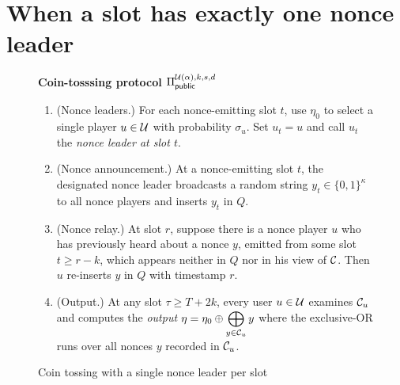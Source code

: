 \section{When a slot has exactly one nonce leader}\label{sec:coin-tossing-single-leader}
\newcommand{\CoinTossingPublic}{\Pi_\mathsf{public}^{\Players(\alpha),k,s,d}}

\begin{figure}
  \begin{framed}    
    \begin{center}
        \textbf{Coin-tosssing protocol $\CoinTossingPublic$}
    \end{center}
    \begin{enumerate}
      \item 
      (Nonce leaders.) 
      For each nonce-emitting slot $t$, use $\eta_0$ to 
      select a single player $u \in \mathcal{U}$ 
      with probability $\sigma_{u}$. 
      Set $u_t = u$ and call $u_t$ the \emph{nonce leader at slot $t$}.
      
      \item 
      (Nonce announcement.)
      At a nonce-emitting slot $t$, the designated nonce leader 
      broadcasts a random string $y_t \in \{0,1\}^\kappa$ 
      to all nonce players and inserts $y_t$ in $Q$. 

      \item 
      (Nonce relay.) 
      At slot $r$, suppose there is a nonce player $u$ who 
      has previously heard about a nonce $y$, 
      emitted from some slot $t \geq r - k$, 
      which appears neither in $Q$ nor in his view of $\mathcal{C}$. 
      Then $u$ re-inserts $y$ in $Q$ with timestamp $r$.

      
      
      \item 
      (Output.)
      At any slot $\tau \geq T + 2k$, 
      every user $u \in \mathcal{U}$ examines $\mathcal{C}_u$ 
      and computes the \emph{output} $\displaystyle \eta = \eta_0 \oplus \bigoplus_{y \in \mathcal{C}_u} y$ 
      where the exclusive-OR runs over 
      all nonces $y$ recorded in $\mathcal{C}_u$. 
    \end{enumerate}
  \end{framed}
  \caption{Coin tossing with a single nonce leader per slot}
  \label{alg:coin-tossing-single-leader}
\end{figure}

